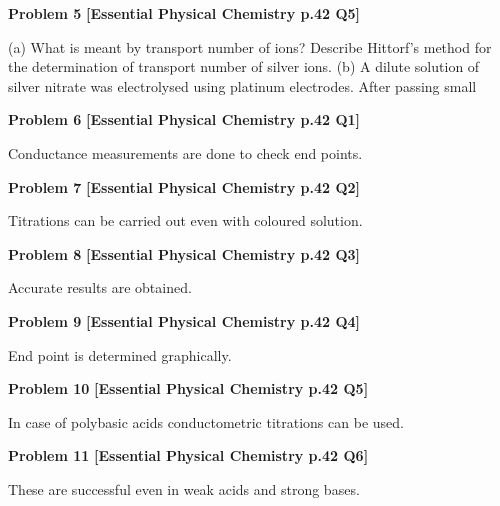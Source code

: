 \begin{problembox}
\textbf{Problem 5} \hfill \textbf{[Essential Physical Chemistry p.42 Q5]}
\label{q:ext-essential_all_questions-5}

(a)
What is meant by transport number of ions? Describe Hittorf's method for the determination of
transport number of silver ions.
(b)
A dilute solution of silver nitrate was electrolysed using platinum electrodes. After passing small
\end{problembox}

\begin{problembox}
\textbf{Problem 6} \hfill \textbf{[Essential Physical Chemistry p.42 Q1]}
\label{q:ext-essential_all_questions-6}

Conductance measurements are done to
check end points.
\end{problembox}

\begin{problembox}
\textbf{Problem 7} \hfill \textbf{[Essential Physical Chemistry p.42 Q2]}
\label{q:ext-essential_all_questions-7}

Titrations can be carried out even with
coloured solution.
\end{problembox}

\begin{problembox}
\textbf{Problem 8} \hfill \textbf{[Essential Physical Chemistry p.42 Q3]}
\label{q:ext-essential_all_questions-8}

Accurate results are obtained.
\end{problembox}

\begin{problembox}
\textbf{Problem 9} \hfill \textbf{[Essential Physical Chemistry p.42 Q4]}
\label{q:ext-essential_all_questions-9}

End point is determined graphically.
\end{problembox}

\begin{problembox}
\textbf{Problem 10} \hfill \textbf{[Essential Physical Chemistry p.42 Q5]}
\label{q:ext-essential_all_questions-10}

In case of polybasic acids conductometric
titrations can be used.
\end{problembox}

\begin{problembox}
\textbf{Problem 11} \hfill \textbf{[Essential Physical Chemistry p.42 Q6]}
\label{q:ext-essential_all_questions-11}

These are successful even in weak acids
and strong bases.
\end{problembox}

